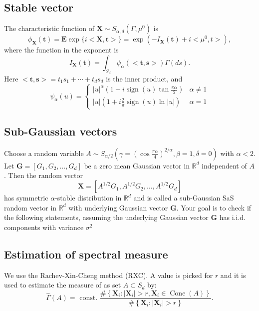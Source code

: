 \documentclass{article}
\begin{document}
	\subsection{Stable vector}
	The characteristic function of $\mathbf{X} \sim S_{\alpha, d}\left(\Gamma, \mu^0\right)$ is
	$$
	\phi_{\mathbf{X}}(\mathbf{t})=\mathbf{E} \exp \{i<\mathbf{X}, \mathbf{t}>\}=\exp \left(-I_{\mathbf{X}}(\mathbf{t})+i<\mu^0, t>\right),
	$$
	where the function in the exponent is
	$$
	I_{\mathbf{X}}(\mathbf{t})=\int_{S_d} \psi_\alpha(<\mathbf{t}, \mathbf{s}>) \Gamma(d s) .
	$$
	Here $<\mathbf{t}, \mathbf{s}>=t_1 s_1+\cdots+t_d s_d$ is the inner product, and
	$$
	\psi_\alpha(u)= \begin{cases}|u|^\alpha\left(1-i \operatorname{sign}(u) \tan \frac{\pi \alpha}{2}\right) & \alpha \neq 1 \\ |u|\left(1+i \frac{2}{\pi} \operatorname{sign}(u) \ln |u|\right) & \alpha=1\end{cases}
	$$
	
	\subsection{Sub-Gaussian vectors}\label{formula1}
	Choose a random variable $A \sim S_{\alpha / 2}\left(\gamma=\left(\cos \frac{\pi \alpha}{4}\right)^{2 / \alpha}, \beta=1, \delta=0\right)$ with $\alpha<2$. Let $\mathbf{G}=\left[G_1, G_2, \ldots, G_d\right]$ be a zero mean Gaussian vector in $\mathbb{R}^d$ independent of $A$. Then the random vector
	$$
	\mathbf{X}=\left[A^{1 / 2} G_1, A^{1 / 2} G_2, \ldots, A^{1 / 2} G_d\right]
	$$
	has symmetric $\alpha$-stable distribution in $\mathbb{R}^d$ and is called a sub-Gaussian SaS random vector in $\mathbb{R}^d$ with underlying Gaussian vector $\mathbf{G}$.
	Your goal is to check if the following statements, assuming the underlying Gaussian vector $\mathbf{G}$ has i.i.d. components with variance $\sigma^2$
	
	
	
	\subsection{Estimation of spectral measure}
	We use the Rachev-Xin-Cheng method (RXC). A value is picked for $r$ and it is used to estimate the measure of as set $A \subset S_d$ by:
	$$
	\widehat{\Gamma}(A)=\text { const. } \frac{\#\left\{\mathbf{X}_i:\left|\mathbf{X}_i\right|>r, \mathbf{X}_i \in \operatorname{Cone}(A)\right\}}{\#\left\{\mathbf{X}_i:\left|\mathbf{X}_i\right|>r\right\}} .
	$$
	
\end{document}
